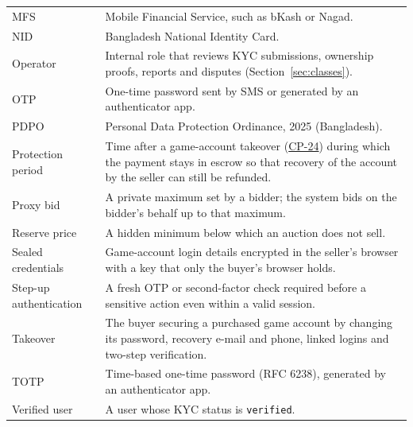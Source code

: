 \documentclass[11pt,a4paper]{report}
\makeatletter
\newcommand{\cp}[1]{\hyperlink{#1}{#1}}
\newenvironment{deftable}{\small\begin{longtable}{@{}>{\raggedright\arraybackslash}p{3.6cm}>{\raggedright\arraybackslash}p{11.3cm}@{}}}{\end{longtable}}
\makeatother
\begin{document}
\begin{deftable}
MFS & Mobile Financial Service, such as bKash or Nagad. \\
NID & Bangladesh National Identity Card. \\
Operator & Internal role that reviews KYC submissions, ownership proofs, reports and disputes (Section~\ref{sec:classes}). \\
OTP & One-time password sent by SMS or generated by an authenticator app. \\
PDPO & Personal Data Protection Ordinance, 2025 (Bangladesh). \\
Protection period & Time after a game-account takeover (\cp{CP-24}) during which the payment stays in escrow so that recovery of the account by the seller can still be refunded. \\
Proxy bid & A private maximum set by a bidder; the system bids on the bidder's behalf up to that maximum. \\
Reserve price & A hidden minimum below which an auction does not sell. \\
Sealed credentials & Game-account login details encrypted in the seller's browser with a key that only the buyer's browser holds. \\
Step-up authentication & A fresh OTP or second-factor check required before a sensitive action even within a valid session. \\
Takeover & The buyer securing a purchased game account by changing its password, recovery e-mail and phone, linked logins and two-step verification. \\
TOTP & Time-based one-time password (RFC 6238), generated by an authenticator app. \\
Verified user & A user whose KYC status is \texttt{verified}. \\
\end{deftable}
\end{document}
